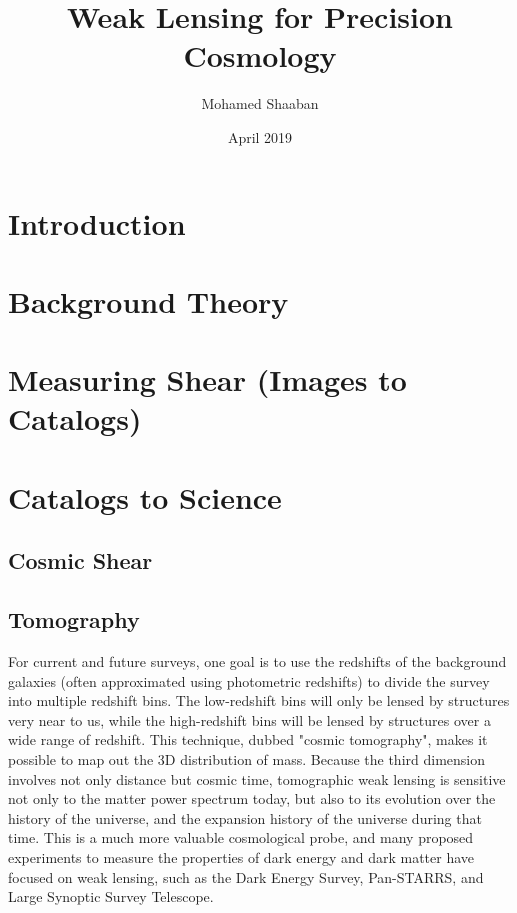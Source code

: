 \documentclass{article}
\title{Weak Lensing for Precision Cosmology}
\author{Mohamed Shaaban}
\date{April 2019}
\begin{document}
\maketitle

\section{Introduction}


\section{Background Theory}



\section{Measuring Shear (Images to Catalogs)}


\section{Catalogs to Science}

\subsection{Cosmic Shear}

\subsection{Tomography}
For current and future surveys, one goal is to use the redshifts of the background galaxies (often approximated using photometric redshifts) to divide the survey into multiple redshift bins. The low-redshift bins will only be lensed by structures very near to us, while the high-redshift bins will be lensed by structures over a wide range of redshift. This technique, dubbed "cosmic tomography", makes it possible to map out the 3D distribution of mass. Because the third dimension involves not only distance but cosmic time, tomographic weak lensing is sensitive not only to the matter power spectrum today, but also to its evolution over the history of the universe, and the expansion history of the universe during that time. This is a much more valuable cosmological probe, and many proposed experiments to measure the properties of dark energy and dark matter have focused on weak lensing, such as the Dark Energy Survey, Pan-STARRS, and Large Synoptic Survey Telescope.
\cite{lensingbook} \cite{rachel_2018} \cite{hoekstra}
\end{document}
